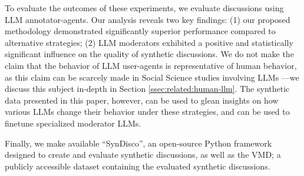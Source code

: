 To evaluate the outcomes of these experiments, we evaluate discussions using \ac{LLM} annotator-agents. Our analysis reveals two key findings: (1) our proposed methodology demonstrated significantly superior performance compared to alternative strategies; (2) \ac{LLM} moderators exhibited a positive and statistically significant influence on the quality of synthetic discussions. We do not make the claim that the behavior of \ac{LLM} user-agents is representative of human behavior, as this claim can be scarcely made in Social Science studies involving \acp{LLM} \cite{rossi_2024}—we discuss this subject in-depth in Section \ref{ssec:related:human-llm}. The synthetic data presented in this paper, however, can be used to glean insights on how various \acp{LLM} change their behavior under these strategies, and can be used to finetune specialized moderator \acp{LLM}.

Finally, we make available “SynDisco”, an open-source Python framework designed to create and evaluate synthetic discussions, as well as the \ac{VMD}\datasetlink; a publicly accessible dataset containing the evaluated synthetic discussions. 